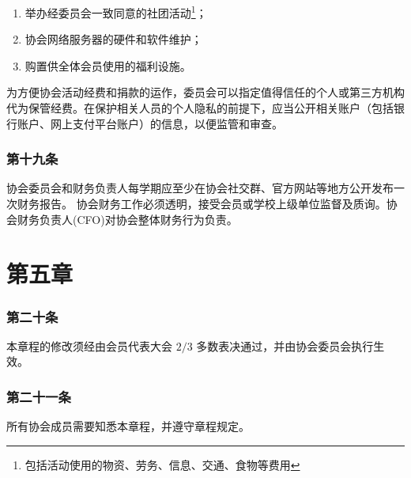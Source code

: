 \documentclass[
]{ctexart}
\begin{document}
\begin{enumerate}
\def\labelenumi{\arabic{enumi}.}
\item
  举办经委员会一致同意的社团活动\footnote{包括活动使用的物资、劳务、信息、交通、食物等费用}；
\item
  协会网络服务器的硬件和软件维护；
\item
  购置供全体会员使用的福利设施。
\end{enumerate}

为方便协会活动经费和捐款的运作，委员会可以指定值得信任的个人或第三方机构代为保管经费。在保护相关人员的个人隐私的前提下，应当公开相关账户（包括银行账户、网上支付平台账户）的信息，以便监管和审查。

\hypertarget{ux7b2cux5341ux4e5dux6761-ux8d22ux52a1ux62a5ux544a}{%
\subsubsection{第十九条}\label{ux7b2cux5341ux4e5dux6761-ux8d22ux52a1ux62a5ux544a}}

协会委员会和财务负责人每学期应至少在协会社交群、官方网站等地方公开发布一次财务报告。
协会财务工作必须透明，接受会员或学校上级单位监督及质询。协会财务负责人(CFO)对协会整体财务行为负责。

\hypertarget{ux7b2cux4e94ux7ae0-ux534fux4f1aux7ae0ux7a0b}{%
\section{第五章}\label{ux7b2cux4e94ux7ae0-ux534fux4f1aux7ae0ux7a0b}}

\hypertarget{ux7b2cux4e8cux5341ux6761-ux534fux4f1aux7ae0ux7a0bux4feeux6539}{%
\subsubsection{第二十条}\label{ux7b2cux4e8cux5341ux6761-ux534fux4f1aux7ae0ux7a0bux4feeux6539}}

本章程的修改须经由会员代表大会 \(2/3\)
多数表决通过，并由协会委员会执行生效。

\hypertarget{ux7b2cux4e8cux5341ux6761-ux534fux4f1aux7ae0ux7a0bux4feeux6539a}{%
\subsubsection{第二十一条}\label{ux7b2cux4e8cux5341ux6761-ux534fux4f1aux7ae0ux7a0bux4feeux6539a}}

所有协会成员需要知悉本章程，并遵守章程规定。
\end{document}
